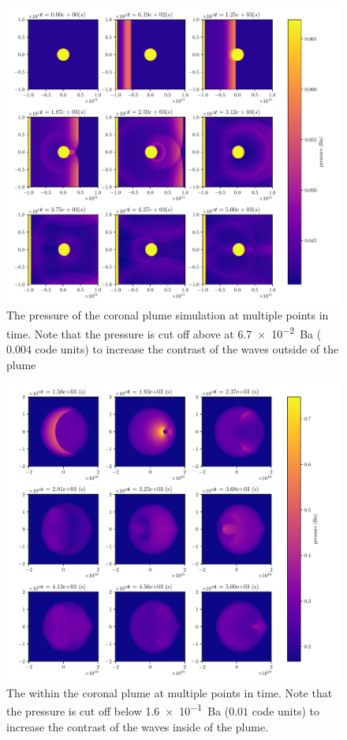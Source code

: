 \documentclass[a4paper]{article}
\numberwithin{figure}{section}
\numberwithin{equation}{section}
\begin{document}
\begin{figure}[ht]
	\centering
	\includegraphics[width=1\textwidth]{figures/plume_time.pdf}
	\caption{The pressure of the coronal plume simulation at multiple points in time. Note that the pressure is cut off above at \SI{6.7e-2}{Ba} ($0.004$ code units) to increase the contrast of the waves outside of the plume}
	\label{fig:figures-plume_time-pdf}
\end{figure}
\begin{figure}[ht]
    \centering
    \includegraphics[width=1\textwidth]{figures/plume_reflection.pdf}
    \caption{The within the coronal plume at multiple points in time. Note that the pressure is cut off below \SI{1.6e-1}{Ba} ($0.01$ code units) to increase the contrast of the waves inside of the plume.}
    \label{fig:figures-plume_reflection-pdf}
\end{figure}
\end{document}
